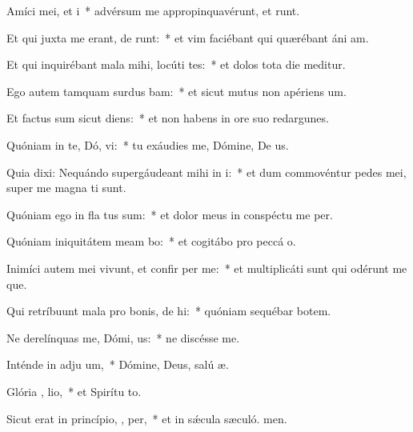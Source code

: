\item Amíci mei, et  i~* advérsum me appropinquavérunt, et runt.
\item Et qui juxta me erant, de  runt:~* et vim faciébant qui quærébant áni am.
\item Et qui inquirébant mala mihi, locúti  tes:~* et dolos tota die meditur.
\item Ego autem tamquam surdus  bam:~* et sicut mutus non apériens  um.
\item Et factus sum sicut   diens:~* et non habens in ore suo redargunes.
\item Quóniam in te, Dó, vi:~* tu exáudies me, Dómine, De us.
\item Quia dixi: Nequándo supergáudeant mihi in i:~* et dum commovéntur pedes mei, super me magna ti sunt.
\item Quóniam ego in fla tus sum:~* et dolor meus in conspéctu me per.
\item Quóniam iniquitátem meam bo:~* et cogitábo pro peccá o.
\item Inimíci autem mei vivunt, et confir  per me:~* et multiplicáti sunt qui odérunt me que.
\item Qui retríbuunt mala pro bonis, de hi:~* quóniam sequébar botem.
\item Ne derelínquas me, Dómi,  us:~* ne discésse  me.
\item Inténde in adju um,~* Dómine, Deus, salú æ.
\item Glória ,  lio,~* et Spirítu to.
\item Sicut erat in princípio,  ,  per,~* et in sǽcula sæculó. men.
